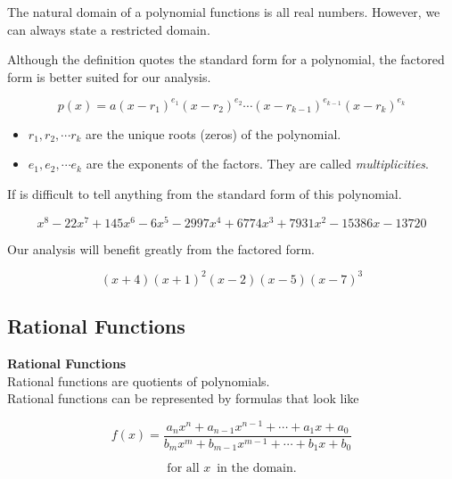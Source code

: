 \documentclass{ximera}
\begin{document}
The natural domain of a polynomial functions is all real numbers.  However, we can always state a restricted domain.




Although the definition quotes the standard form for a polynomial, the factored form is better suited for our analysis.

\[
p(x) = a (x - r_1)^{e_1} (x - r_2)^{e_2} \cdots (x - r_{k-1})^{e_{k-1}} (x - r_k)^{e_k}  
\]


\begin{itemize}
\item $r_1, r_2, \cdots r_k$ are the unique roots (zeros) of the polynomial.
\item $e_1, e_2, \cdots e_k$ are the exponents of the factors. They are called \textit{multiplicities}.
\end{itemize}



\begin{example}

If is difficult to tell anything from the standard form of this polynomial.

\[
x^8 - 22 x^7 +145 x^6 - 6 x^5 - 2997 x^4 + 6774 x^3 + 7931 x^2 - 15386 x - 13720
\]



Our analysis will benefit greatly from the factored form.


\[
(x+4) (x+1)^2 (x-2) (x-5) (x-7)^3
\]




\end{example}




















\subsection*{Rational Functions}




\begin{template}  \textbf{\textcolor{blue!55!black}{Rational Functions}} \\



Rational functions are quotients of polynomials. \\


Rational functions can be represented by formulas that look like


\[ 
f(x) = \frac{ a_n x^n + a_{n-1} x^{n-1} + \cdots + a_1 x + a_0 } {b_m x^m + b_{m-1} x^{m-1} + \cdots + b_1 x + b_0}
\]


\[  \text{ for all } x  \, \text{ in the domain. }   \]



\end{template}
\end{document}
